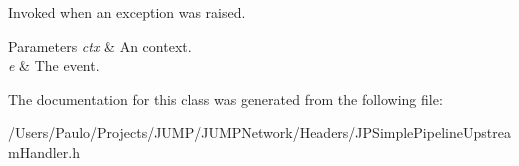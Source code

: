 Invoked when an exception was raised. 


\begin{DoxyParams}{Parameters}
{\em ctx} & An context. \\
\hline
{\em e} & The event. \\
\hline
\end{DoxyParams}


The documentation for this class was generated from the following file:\begin{DoxyCompactItemize}
\item 
/Users/Paulo/Projects/JUMP/JUMPNetwork/Headers/JPSimplePipelineUpstreamHandler.h\end{DoxyCompactItemize}
